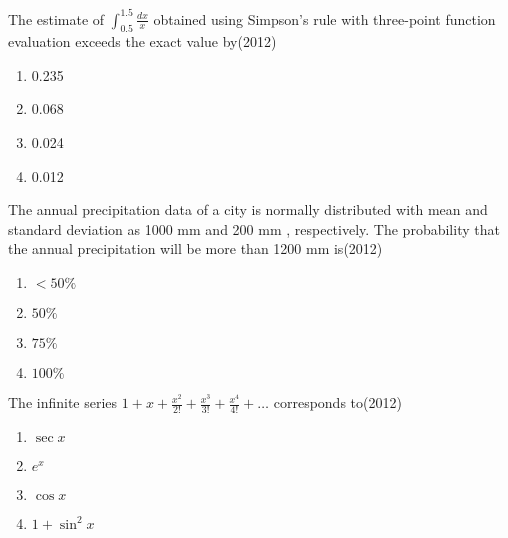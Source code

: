  \iffalse
 \chapter{2012}
 \author{Prajwal naik}
 \section{ce}
 \fi







\item The estimate of $\int_{0.5}^{1.5} \frac{dx}{x}$ obtained using Simpson's rule with three-point function evaluation exceeds the exact value by\hfill{(2012)}
    \begin{multicols}{4}
			\begin{enumerate}
\item 0.235
\item 0.068
\item 0.024
\item 0.012
        \end{enumerate}
			\end{multicols}

	\item The annual precipitation data of a city is normally distributed with mean and standard deviation as 1000 mm and 200 mm , respectively. The probability that the annual precipitation will be more than 1200 mm is\hfill{(2012)}

   \begin{multicols}{4}
			\begin{enumerate}

\item  $<50 \%$
\item $50 \%$
\item $75 \%$
\item $100 \%$
\end{enumerate}
		\end{multicols}


	\item The infinite series $1+x+\frac{x^{2}}{2!}+\frac{x^{3}}{3!}+\frac{x^{4}}{4!}+\ldots$ corresponds to\hfill{(2012)}

   \begin{multicols}{4}
			\begin{enumerate}
\item  $\sec x$
\item ${e}^{x}$
\item $\cos x$
\item $1+\sin ^{2} x$
  \end{enumerate}
		\end{multicols}


